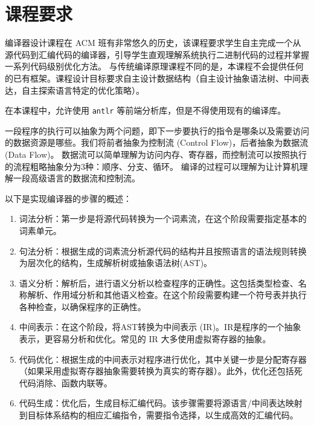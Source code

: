 \chapter{课程要求}

编译器设计课程在 ACM 班有非常悠久的历史，该课程要求学生自主完成一个从源代码到汇编代码的编译器，引导学生直观理解系统执行二进制代码的过程并掌握一系列代码级别优化方法。
与传统编译原理课程不同的是，本课程不会提供任何的已有框架。课程设计目标要求自主设计数据结构（自主设计抽象语法树、中间表达，自主探索语言特定的优化策略）。

\begin{remark}
    在本课程中，允许使用 \texttt{antlr} 等前端分析库，但是不得使用现有的编译库。
\end{remark}

一段程序的执行可以抽象为两个问题，即下一步要执行的指令是哪条以及需要访问的数据资源是哪些。我们将前者抽象为控制流 (Control Flow)，后者抽象为数据流 (Data Flow)。
数据流可以简单理解为访问内存、寄存器，而控制流可以按照执行的流程粗略抽象分为3种：顺序、分支、循环。
编译的过程可以理解为让计算机理解一段高级语言的数据流和控制流。

以下是实现编译器的步骤的概述：

\begin{enumerate}
    \item 词法分析：第一步是将源代码转换为一个词素流，在这个阶段需要指定基本的词素单元。
    \item 句法分析：根据生成的词素流分析源代码的结构并且按照语言的语法规则转换为层次化的结构，生成解析树或抽象语法树(AST)。
    \item 语义分析：解析后，进行语义分析以检查程序的正确性。这包括类型检查、名称解析、作用域分析和其他语义检查。在这个阶段需要构建一个符号表并执行各种检查，以确保程序的正确性。
    \item 中间表示：在这个阶段，将AST转换为中间表示 (IR)。IR是程序的一个抽象表示，更容易分析和优化。常见的 IR 大多使用虚拟寄存器的抽象。
    \item 代码优化：根据生成的中间表示对程序进行优化，其中关键一步是分配寄存器（如果采用虚拟寄存器抽象需要转换为真实的寄存器）。此外，优化还包括死代码消除、函数内联等。
    \item 代码生成：优化后，生成目标汇编代码。该步骤需要将源语言/中间表达映射到目标体系结构的相应汇编指令，需要指令选择，以生成高效的汇编代码。
\end{enumerate}

